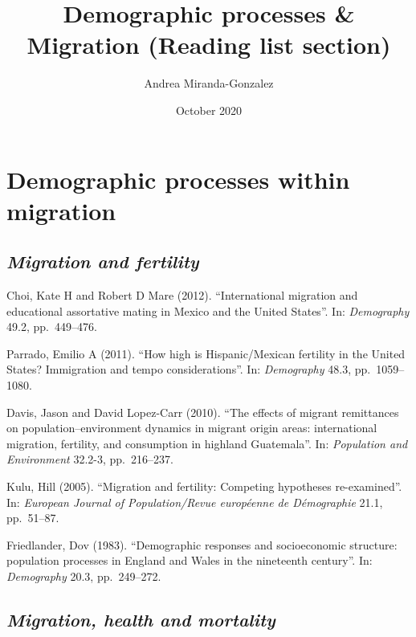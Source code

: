 \documentclass[
  12pt,
]{article}
\title{Demographic processes \& Migration (Reading list section)}
\author{Andrea Miranda-Gonzalez}
\date{October 2020}
\begin{document}
\maketitle

{
\setcounter{tocdepth}{2}
\tableofcontents
}
\hypertarget{demographic-processes-within-migration}{%
\section{\texorpdfstring{\textbf{Demographic processes within
migration}}{Demographic processes within migration}}\label{demographic-processes-within-migration}}

\hypertarget{migration-and-fertility}{%
\subsection{\texorpdfstring{\emph{Migration and
fertility}}{Migration and fertility}}\label{migration-and-fertility}}

Choi, Kate H and Robert D Mare (2012). ``International migration and
educational assortative mating in Mexico and the United States''. In:
\emph{Demography} 49.2, pp.~449--476.

Parrado, Emilio A (2011). ``How high is Hispanic/Mexican fertility in
the United States? Immigration and tempo considerations''. In:
\emph{Demography} 48.3, pp.~1059--1080.

Davis, Jason and David Lopez-Carr (2010). ``The effects of migrant
remittances on population--environment dynamics in migrant origin areas:
international migration, fertility, and consumption in highland
Guatemala''. In: \emph{Population and Environment} 32.2-3, pp.~216--237.

Kulu, Hill (2005). ``Migration and fertility: Competing hypotheses
re-examined''. In:
\emph{European Journal of Population/Revue européenne de Démographie}
21.1, pp.~51--87.

Friedlander, Dov (1983). ``Demographic responses and socioeconomic
structure: population processes in England and Wales in the nineteenth
century''. In: \emph{Demography} 20.3, pp.~249--272.

\hypertarget{migration-health-and-mortality}{%
\subsection{\texorpdfstring{\emph{Migration, health and
mortality}}{Migration, health and mortality}}\label{migration-health-and-mortality}}
\end{document}
